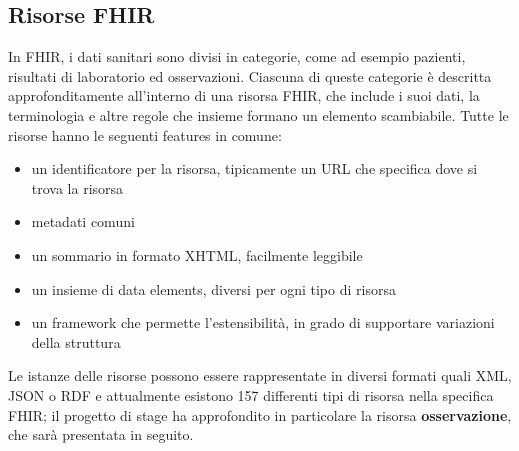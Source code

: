 \documentclass{article}
\begin{document}
\subsection{Risorse FHIR}
In FHIR, i dati sanitari sono divisi in categorie, come ad esempio pazienti, risultati di laboratorio ed osservazioni.
Ciascuna di queste categorie è descritta approfonditamente all'interno di una risorsa FHIR, che include i suoi dati, la terminologia e altre regole che insieme formano un elemento
scambiabile.
Tutte le risorse hanno le seguenti features in comune:
\begin{itemize}
    \item un identificatore per la risorsa, tipicamente un URL che specifica dove si trova la risorsa
    \item metadati comuni
    \item un sommario in formato XHTML, facilmente leggibile
    \item un insieme di data elements, diversi per ogni tipo di risorsa
    \item un framework che permette l'estensibilità, in grado di supportare variazioni della struttura
\end{itemize}
Le istanze delle risorse possono essere rappresentate in diversi formati quali XML, JSON o RDF e attualmente esistono
157 differenti tipi di risorsa nella specifica FHIR; il progetto di stage ha approfondito in particolare la risorsa \textbf{osservazione},
che sarà presentata in seguito.
\end{document}
